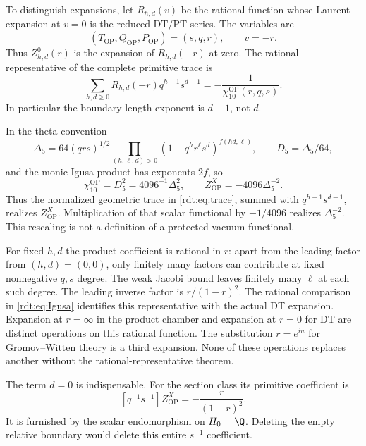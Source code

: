 To distinguish expansions, let $R_{h,d}(v)$ be the rational function
whose Laurent expansion at $v=0$ is the reduced DT/PT series.
The variables are
\begin{equation}\label{rdt:eq:OPvars}
 (T_{\mathrm{OP}},Q_{\mathrm{OP}},P_{\mathrm{OP}})=(s,q,r),
 \qquad v=-r.
\end{equation}
Thus $Z_{h,d}^{0}(r)$ is the expansion of $R_{h,d}(-r)$ at zero.
The rational representative of the complete primitive trace is
\begin{equation}\label{rdt:eq:Igusa}
 \sum_{h,d\ge0}R_{h,d}(-r)q^{h-1}s^{d-1}
   =-\frac1{\chi_{10}^{\mathrm{OP}}(r,q,s)}.
\end{equation}
In particular the boundary-length exponent is $d-1$, not $d$.

In the theta convention
\[
 \Delta_5=64(qrs)^{1/2}
  \prod_{(h,\ell,d)>0}(1-q^hr^\ell s^d)^{f(hd,\ell)},
 \qquad D_5=\Delta_5/64,
\]
and the monic Igusa product has exponents $2f$, so
\begin{equation}\label{rdt:eq:Igusanorm}
 \chi_{10}^{\mathrm{OP}}=D_5^2=4096^{-1}\Delta_5^2,
 \qquad Z^X_{\mathrm{OP}}=-4096\Delta_5^{-2}.
\end{equation}
Thus the normalized geometric trace in \eqref{rdt:eq:trace}, summed
with $q^{h-1}s^{d-1}$, realizes $Z^X_{\mathrm{OP}}$.
Multiplication of that scalar functional by $-1/4096$ realizes
$\Delta_5^{-2}$. This rescaling is not a definition of a protected
vacuum functional.

For fixed $h,d$ the product coefficient is rational in $r$: apart
from the leading factor from $(h,d)=(0,0)$, only finitely many
factors can contribute at fixed nonnegative $q,s$ degree. The weak
Jacobi bound leaves finitely many $\ell$ at each such degree. The
leading inverse factor is $r/(1-r)^2$. The rational comparison in
\eqref{rdt:eq:Igusa} identifies this representative with the actual
DT expansion. Expansion at $r=\infty$ in the product chamber and
expansion at $r=0$ for DT are distinct operations on this rational
function. The substitution $r=e^{iu}$ for Gromov--Witten theory
is a third expansion. None of these operations replaces another
without the rational-representative theorem.

The term $d=0$ is indispensable. For the section class its primitive
coefficient is
\[
 [q^{-1}s^{-1}]Z^X_{\mathrm{OP}}
    =-\frac{r}{(1-r)^2}.
\]
It is furnished by the scalar endomorphism on $H_0=\Q$.
Deleting the empty relative boundary would delete this entire
$s^{-1}$ coefficient.

